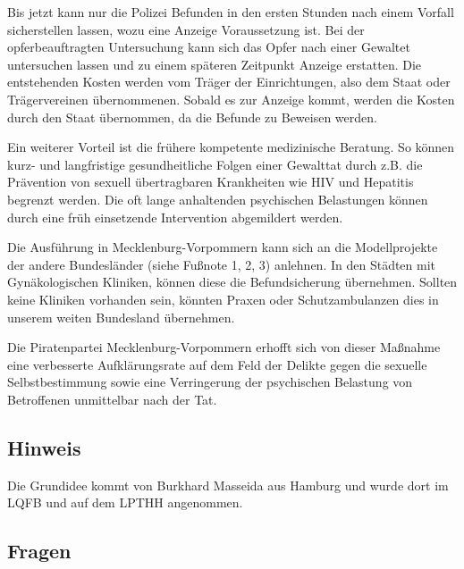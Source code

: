 Bis jetzt kann nur die Polizei Befunden in den ersten Stunden nach einem Vorfall sicherstellen lassen, wozu eine Anzeige Voraussetzung ist. Bei der opferbeauftragten Untersuchung kann sich das Opfer nach einer Gewaltet untersuchen lassen und zu einem späteren Zeitpunkt Anzeige erstatten. Die entstehenden Kosten werden vom Träger der Einrichtungen, also dem Staat oder Trägervereinen übernommenen. Sobald es zur Anzeige kommt, werden die Kosten durch den Staat übernommen, da die Befunde zu Beweisen werden.

Ein weiterer Vorteil ist die frühere kompetente medizinische Beratung. So können kurz- und langfristige gesundheitliche Folgen einer Gewalttat durch z.B. die Prävention von sexuell übertragbaren Krankheiten wie HIV und Hepatitis begrenzt werden. Die oft lange anhaltenden psychischen Belastungen können durch eine früh einsetzende Intervention abgemildert werden.

Die Ausführung in Mecklenburg-Vorpommern kann sich an die Modellprojekte der andere Bundesländer (siehe Fußnote 1, 2, 3) anlehnen. In den Städten mit Gynäkologischen Kliniken, können diese die Befundsicherung übernehmen. Sollten keine Kliniken vorhanden sein, könnten Praxen oder Schutzambulanzen dies in unserem weiten Bundesland übernehmen.

Die Piratenpartei Mecklenburg-Vorpommern erhofft sich von dieser Maßnahme eine verbesserte Aufklärungsrate auf dem Feld der Delikte gegen die sexuelle Selbstbestimmung sowie eine Verringerung der psychischen Belastung von Betroffenen unmittelbar nach der Tat.

\subsection{Hinweis}

Die Grundidee kommt von Burkhard Masseida aus Hamburg und wurde dort im LQFB und auf dem LPTHH angenommen.

\subsection{Fragen}

